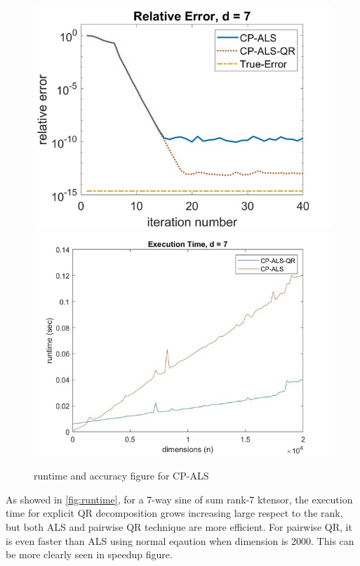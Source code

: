 \documentclass{article}
\begin{document}
\begin{figure}[ht!]
  \begin{center}
    
    \includegraphics*[scale = 0.3]{accuracy.jpeg}
    \includegraphics*[scale = 0.3]{runtime.jpeg}
    
    \caption[Figure]{runtime and accuracy figure for CP-ALS \label{fig:error}}
  \end{center}
  
\end{figure}

As showed in \cref*{fig:runtime}, for a 7-way sine of sum rank-7 ktensor, the execution time for explicit QR decomposition
grows increasing large respect to the rank, but both ALS and pairwise QR technique are more efficient.
For pairwise QR, it is even faster than ALS using normal eqaution when dimension is 2000. This can be more clearly seen in speedup figure.
\end{document}
